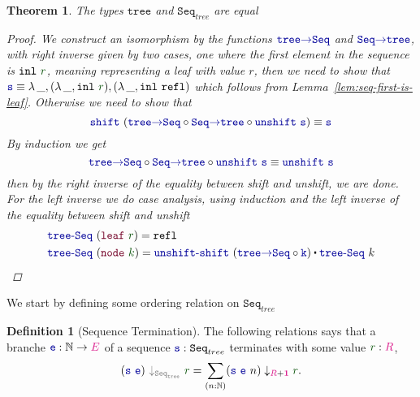 \documentclass[twoside,11pt,openright]{report}
\theoremstyle{plain} %
\newtheorem{thm}{Theorem}[section]
\theoremstyle{definition}
\newtheorem{defn}{Definition}[section]
\theoremstyle{remark}
\newcommand*{\lemref}[1]{Lemma~\ref{lem:#1}}
\newcommand*{\term}[1]{\textcolor{green!30!black}{#1}} %
\newcommand*{\type}[1]{\textcolor{magenta!90!black}{#1}}
\newcommand*{\unit}{\type{\textbf{1}}}
\newcommand*{\relation}[1]{\textcolor{gray}{\ensuremath{\mathtt{#1}}}}
\newcommand*{\function}[1]{\textcolor{blue!60!black}{\ensuremath{\mathtt{#1}}}}
\newcommand*{\constructor}[1]{\textcolor{purple!60!black}{\ensuremath{\mathtt{#1}}}}
\newcommand*{\typeformer}[1]{\ensuremath{\mathtt{#1}}}
\newcommand{\ct}{%
  \mathchoice{\mathbin{\raisebox{0.5ex}{$\displaystyle\centerdot$}}}%
             {\mathbin{\raisebox{0.5ex}{$\centerdot$}}}%
             {\mathbin{\raisebox{0.25ex}{$\scriptstyle\,\centerdot\,$}}}%
             {\mathbin{\raisebox{0.1ex}{$\scriptscriptstyle\,\centerdot\,$}}}
}
\begin{document}
\begin{thm}
  The types \(\typeformer{tree}\) and \(\typeformer{Seq}_{tree}\) are equal
  \begin{proof}
    We construct an isomorphism by the functions \(\function{tree{\rightarrow}Seq}\) and \(\function{Seq{\rightarrow}tree}\), with right inverse given by two cases, one where the first element in the sequence is \(\mathtt{inl}~\term{r}\), meaning representing a leaf with value \(r\), then we need to show that \(\function{s} \equiv \lambda\,\_,(\lambda\,\_,\mathtt{inl}~\term{r}),(\lambda\,\_,\mathtt{inl}~\mathtt{refl})\) which follows from \lemref{seq-first-is-leaf}. Otherwise we need to show that
    \begin{equation}
      \function{shift}~(\function{tree{\rightarrow}Seq} \circ \function{Seq{\rightarrow}tree} \circ \function{unshift}~\function{s}) \equiv \function{s}
    \end{equation}
    By induction we get
    \begin{equation}
      \function{tree{\rightarrow}Seq} \circ \function{Seq{\rightarrow}tree} \circ \function{unshift}~\function{s} \equiv \function{unshift}~\function{s}
    \end{equation}
    then by the right inverse of the equality between shift and unshift, we are done. For the left inverse we do case analysis, using induction and the left inverse of the equality between shift and unshift
    \begin{equation}
      \begin{aligned}
        &\function{tree\text{-}Seq}~(\constructor{leaf}~\term{r}) = \mathtt{refl} \\
        &\function{tree\text{-}Seq}~(\constructor{node}~\term{k}) = \function{unshift\text{-}shift}~(\function{tree{\rightarrow}Seq} \circ \function{k}) \ct \function{tree\text{-}Seq}~k
      \end{aligned}
    \end{equation}
  \end{proof}
\end{thm}
\noindent We start by defining some ordering relation on \(\typeformer{Seq}_{tree}\)
\begin{defn}[Sequence Termination]
  The following relations says that a branche \(\function{e} : \mathbb{N} \rightarrow \type{E}\) of a sequence \(\function{s} : \typeformer{Seq}_{tree}\) terminates with some value \(\term{r} : \type{R}\),
  \begin{equation}
    (\function{s}~\function{e})~\relation{\downarrow_{\typeformer{Seq}_{tree}}}~\term{r} = \sum_{(n : \mathbb{N})} (\function{s}~\function{e}~n) \downarrow_{\type{R} + \unit} \term{r}.
  \end{equation}
\end{defn}
\end{document}
